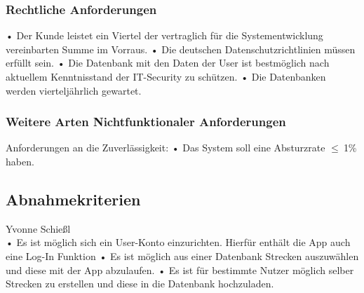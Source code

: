 \documentclass[a4paper, 12pt]{article}
\begin{document}
\subsubsection{Rechtliche Anforderungen}
• Der Kunde leistet ein Viertel der vertraglich für die Systementwicklung vereinbarten Summe im Vorraus.\newline
\label{Datenschutz}
• Die deutschen Datenschutzrichtlinien müssen erfüllt sein.\newline
\label{Sicherheit}
• Die Datenbank mit den Daten der User ist bestmöglich nach aktuellem Kenntnisstand der IT-Security zu schützen.\newline
• Die Datenbanken werden vierteljährlich gewartet.
\subsubsection{Weitere Arten Nichtfunktionaler Anforderungen}
\label{Bugs}
Anforderungen an die Zuverlässigkeit:\newline
• Das System soll eine Absturzrate  $\leq \ $1\% haben. %


\subsection{Abnahmekriterien}Yvonne Schießl\\
• Es ist möglich sich ein User-Konto einzurichten. Hierfür enthält die App auch eine Log-In Funktion\newline
• Es ist möglich aus einer Datenbank Strecken auszuwählen und diese mit der App abzulaufen.\newline
• Es ist für bestimmte Nutzer möglich selber Strecken zu erstellen und diese in die Datenbank hochzuladen.



\newpage
\end{document}
